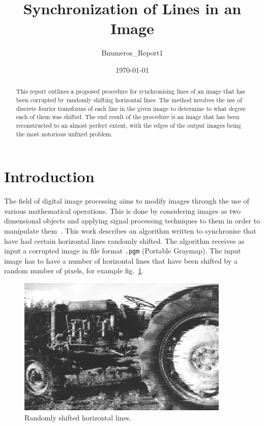 \documentclass[a4paper,10pt]{article}
\title{Synchronization of Lines in an Image}
\author{Bnumeros\_Report1}
\date{\today}
\begin{document}
\maketitle

\begin{abstract}
 This report outlines a proposed procedure for synchronising lines of an image that has been corrupted by randomly shifting horizontal lines. The method involves the use of discrete fourier transforms of each line in the given image to determine to what degree each of them was shifted. The end result of the procedure is an image that has been reconstructed to an almost perfect extent, with the edges of the output images being the most notorious unfixed problem.
\end{abstract}

\section{Introduction}

The field of digital image processing aims to modify images through the use of various mathematical operations. This is done by considering images as two dimensional objects and applying signal processing techniques to them in order to manipulate them~\cite{gonzalez1992digital}. This work describes an algorithm written to synchronise that have had certain horizontal lines randomly shifted. The algorithm receives as input a corrupted image in file format \texttt{.pgm} (Portable Graymap). The input image has to have a number of horizontal lines that have been shifted by a random number of pixels, for example fig.~\ref{fig.1}.

\begin{figure}[h!]
\centering
\includegraphics[width=0.9\textwidth]{img/desync2}
\caption{Randomly shifted horizontal lines.}
\label{fig.1}
\end{figure}
\end{document}
